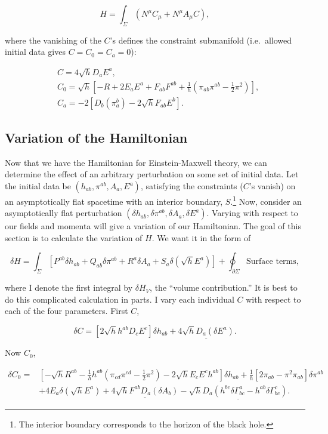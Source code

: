 \documentclass[titlepage]{article}
\def\beq{\begin{equation}}
\def\eeq{\end{equation}}
\begin{document}
\beq
H = \int_\Sigma \left( N^\mu C_\mu + N^\mu A_\mu C \right),
\eeq

\noindent
where the vanishing of the $C$'s defines the constraint submanifold (i.e.\ allowed initial data gives $C=C_0=C_a=0$):

\beq
\begin{aligned}
&C    = 4 \sqrt{h} D_aE^a , \\
&C_0  =\sqrt{h} \left[-R + 2E_aE^a + F_{ab}F^{ab} + \frac{1}{h}\left( \pi_{ab}\pi^{ab} - \frac{1}{2}\pi^2 \right) \right] , \\
&C_a  =-2\left[ D_b\left(\pi^b_a \right)-2\sqrt{h} F_{ab}E^b \right].
\end{aligned}
\eeq


\subsection{Variation of the Hamiltonian}

Now that we have the Hamiltonian for Einstein-Maxwell theory, we can determine the effect of an arbitrary perturbation on some set of initial data. Let the initial data be $(h_{ab},\pi^{ab},A_a,E^a)$, satisfying the constraints ($C$'s vanish) on an asymptotically flat spacetime with an interior boundary, $S$.\footnote{The interior boundary corresponds to the horizon of the black hole.}  Now, consider an asymptotically flat perturbation $(\delta h_{ab},\delta\pi^{ab},\delta A_a,\delta E^a)$. Varying with respect to our fields and momenta will give a variation of our Hamiltonian.  The goal of this section is to calculate the variation of $H$.  We want it in the form of 

\beq
\delta H = \int_\Sigma \left[ P^{ab} \delta h_{ab} + Q_{ab}\delta \pi^{ab} +R^a\delta A_a + S_a\delta\left(\sqrt{h}E^a \right)    \right] + \oint_{\partial\Sigma}\text{Surface terms},
\eeq

\noindent
where I denote the first integral by $\delta H_V$, the ``volume contribution.''  It is best to do this complicated calculation in parts.  I vary each individual $C$ with respect to each of the four parameters.  First $C$,

\beq
\delta C = \left[2 \sqrt{h} h^{ab}D_cE^c \right] \delta h_{ab} + \underline{4\sqrt{h} D_a\left(\delta E^a\right)}.
\eeq

\noindent
Now $C_0$,

\beq
\begin{aligned}
\delta C_0 =& \left[-\sqrt{h}R^{ab}-\frac{1}{h}h^{ab}\left( \pi_{cd}\pi^{cd} -\frac{1}{2} \pi^2 \right) -2\sqrt{h}E_cE^c h^{ab} \right] \delta h_{ab} + \frac{1}{h}\left[2\pi_{ab} - \pi^2 \pi_{ab} \right] \delta \pi^{ab} \\ &+ 4 E_a \delta\left( \sqrt{h} E^a \right) + \underline{4\sqrt{h}F^{ab}D_a(\delta A_b)} - \underline{\sqrt{h}D_a \left(h^{bc} \delta \Gamma^a_{bc} - h^{ab}\delta \Gamma^c_{bc} \right)}.
\end{aligned}
\eeq
\end{document}
